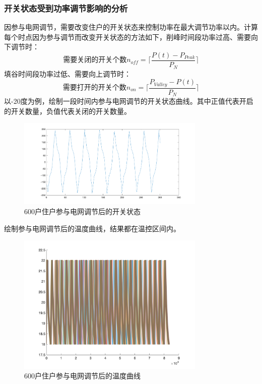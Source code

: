 \documentclass[withoutpreface,bwprint]{cumcmthesis} %
\begin{document}
    \subsubsection{开关状态受到功率调节影响的分析}
    因参与电网调节，需要改变住户的开关状态来控制功率在最大调节功率以内。计算每个时点因为参与调节而改变开关状态的方法如下，削峰时间段功率过高、需要向下调节时：
    $$
    \mbox{需要关闭的开关个数}n_{off} =\lceil \frac{ P(t)- P_{Peak} }{P_N}\rceil
    $$
    填谷时间段功率过低、需要向上调节时：
$$
    \mbox{需要打开的开关个数}n_{on} =\lceil \frac{ P_{Valley} -P(t)}{P_N}\rceil
    $$
    以-20度为例，绘制一段时间内参与电网调节的开关状态曲线。其中正值代表开启的开关数量，负值代表关闭的开关数量。
    \begin{figure}[H]
    \centering
        \includegraphics[width=0.8\textwidth]{figures/5-3-on.png}
    \caption{600户住户参与电网调节后的开关状态}
    \label{fig:my_label}
    \end{figure}
    绘制参与电网调节后的温度曲线，结果都在温控区间内。
    \begin{figure}[H]
    \centering
        \includegraphics[width=0.8\textwidth]{figures/600-total-t.png}
    \caption{600户住户参与电网调节后的温度曲线}
    \label{fig:my_label}
    \end{figure}
\end{document}
